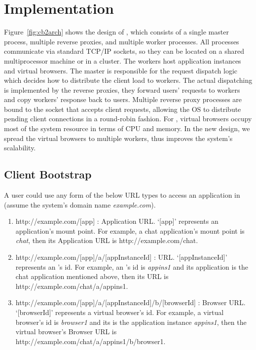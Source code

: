 \chapter{Implementation}
\label{ch:impl}

\newarchitectureoverview{}

Figure~\ref{fig:cb2arch} shows the design of \cbtwo, which consists of a single
master process, multiple reverse proxies, and multiple worker processes.
All processes communicate via standard TCP/IP sockets, 
so they can be located on a shared multiprocessor machine or in a cluster.
The workers host application instances and virtual browsers.
The master is responsible for the request dispatch logic which
decides how to distribute the client load to workers.
The actual dispatching is implemented by the reverse proxies,
they forward users' requests to workers and copy workers' response
back to users.
Multiple reverse proxy processes are bound to the socket that accepts client requests, allowing
the OS to distribute pending client connections in a round-robin fashion.
For \cb, virtual browsers occupy most of the system resource in terms of CPU and
memory. In the new design, we spread the virtual browsers to multiple workers, 
thus improves the system's scalability.


\section{Client Bootstrap}
A user could use any form of the below URL types to access an application in \cb{} (assume
the system's domain name \emph{example.com}).

\begin{enumerate}

\item \label{itm:appurl} http://example.com/[app] : Application URL.
`[app]' represents an application's mount point. 
For example, a chat application's mount point is \emph{chat},
then its Application URL is http://example.com/chat.


\item \label{itm:appinsurl} http://example.com/[app]/a/[appInstanceId] : \appins{} URL.
`[appInstanceId]' represents an \appins{}'s id. 
For example,
an \appins{}'s id is \emph{appins1} and its application is the chat application mentioned 
above, then its \appins{} URL is
 http://example.com/chat/a/appins1.


\item \label{itm:vburl} http://example.com/[app]/a/[appInstanceId]/b/[browserId] : Browser URL.
`[browserId]' represents a virtual browser's id. 
For example, 
a virtual browser's id is \emph{browser1} and its \appins{} is the
application instance \emph{appins1}, then the virtual browser's Browser URL is
 http://example.com/chat/a/appins1/b/browser1.

\end{enumerate}

